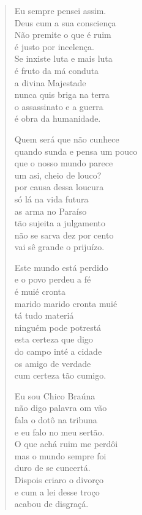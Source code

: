 \begin{verse}
Eu sempre pensei assim.\\
Deus cum a sua consciença\\
Não premite o que é ruim\\
é justo por incelença.\\
Se inxiste luta e mais luta\\
é fruto da má conduta\\
a divina Majestade\\
nunca quis briga na terra\\
o assassinato e a guerra\\
é obra da humanidade.

Quem será que não cunhece\\
quando sunda e pensa um pouco\\
que o nosso mundo parece\\
um asi, cheio de louco?\\
por causa dessa loucura\\
só lá na vida futura\\
as arma no Paraíso\\
tão sujeita a julgamento\\
não se sarva dez por cento\\
vai sê grande o prijuízo.

Este mundo está perdido\\
e o povo perdeu a fé\\
é muié cronta\\
marido marido cronta muié\\
tá tudo materiá\\
ninguém pode potrestá\\
esta certeza que digo\\
do campo inté a cidade\\
os amigo de verdade\\
cum certeza tão cumigo.

Eu sou Chico Braúna\\
não digo palavra om vão\\
fala o dotô na tribuna\\
e eu falo no meu sertão.\\
O que achá ruim me perdôi\\
mas o mundo sempre foi\\
duro de se cuncertá.\\
Dispois criaro o divorço\\
e cum a lei desse troço\\
acabou de disgraçá.
\end{verse}


